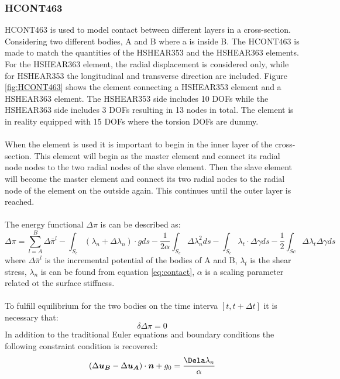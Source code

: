 \subsubsection{HCONT463}
HCONT463 is used to model contact between different layers in a cross-section.  Considering two different bodies, A and B where a is inside B. The HCONT463 is made to match the quantities of the HSHEAR353 and the HSHEAR363 elements. For the HSHEAR363 element, the radial displacement is considered only, while for HSHEAR353 the longitudinal and transverse direction are included. Figure \ref{fig:HCONT463} shows the element connecting a HSHEAR353 element and a HSHEAR363 element. The HSHEAR353 side includes 10 DOFs while the HSHEAR363 side includes 3 DOFs resulting in 13 nodes in total. The element is in reality equipped with 15 DOFs where the torsion DOFs are dummy.\\\\ When the element is used it is important to begin in the inner layer of the cross-section. This element will begin as the master element and connect its radial node nodes to the two radial nodes of the slave element. Then the slave element will become the master element and connect its two radial nodes to the radial node of the element on the outside again. This continues until the outer layer is reached.\\\\The energy functional $\Delta \pi$ is can be described as:
\begin{equation}
    \Delta \pi = \sum_{l=A}^B \Delta \bar{\pi}^{l} - \int_{S_c} (\lambda_n + \Delta \lambda_n) \cdot gds - \frac{1}{2 \alpha} \int_{S_c} \Delta \lambda_n^2 ds - \int_{S_c} \lambda_t \cdot \Delta \gamma ds - \frac{1}{2} \int_{Sc} \Delta \lambda_t \Delta \gamma ds
    \label{eq:energy}
\end{equation}
where $\Delta \bar{\pi}^{l}$ is the incremental potential of the bodies of A and B, $\lambda_t$ is the shear stress, $\lambda_n$ is can be found from equation \ref{eq:contact}, $\alpha$ is a scaling parameter related ot the surface stiffness. \\\\ To fulfill equilibrium for the two bodies on the time interva $[t,t+\Delta t]$ it is necessary that:
\begin{equation}
    \delta \Delta \pi =0
\end{equation}
In addition to the traditional Euler equations and boundary conditions the following constraint condition is recovered: 
\begin{equation}
    (\Delta \boldsymbol{u_B} - \Delta \boldsymbol{u_A}) \cdot \boldsymbol{n} + g_0=\frac{\Dela \lambda_n}{\alpha}
    \label{eq:contact}
\end{equation}
